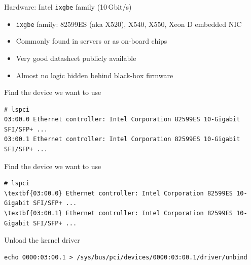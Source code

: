 \documentclass[NET,english,aspectratio=169,notitleframe]{tumbeamer}
\begin{document}
\begin{frame}{Hardware: Intel \texttt{ixgbe} family (10\,Gbit/s)}
\begin{itemize}
\item \texttt{ixgbe} family: 82599ES (aka X520), X540, X550, Xeon D embedded NIC
\item Commonly found in servers or as on-board chips
\item Very good datasheet publicly available
\item Almost no logic hidden behind black-box firmware
\end{itemize}
\end{frame}



\begin{frame}[fragile=singleslide]{Find the device we want to use}
\begin{Verbatim}[commandchars=\\\{\}]
# lspci
03:00.0 Ethernet controller: Intel Corporation 82599ES 10-Gigabit SFI/SFP+ ...
03:00.1 Ethernet controller: Intel Corporation 82599ES 10-Gigabit SFI/SFP+ ...
\end{Verbatim}
\end{frame}

\begin{frame}[fragile=singleslide]{Find the device we want to use}
\begin{Verbatim}[commandchars=\\\{\}]
# lspci
\textbf{03:00.0} Ethernet controller: Intel Corporation 82599ES 10-Gigabit SFI/SFP+ ...
\textbf{03:00.1} Ethernet controller: Intel Corporation 82599ES 10-Gigabit SFI/SFP+ ...
\end{Verbatim}
\end{frame}

\begin{frame}[fragile=singleslide]{Unload the kernel driver}
\begin{verbatim}
echo 0000:03:00.1 > /sys/bus/pci/devices/0000:03:00.1/driver/unbind
\end{verbatim}
\end{frame}
\end{document}
